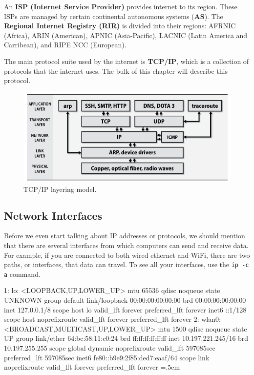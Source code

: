 \documentclass{article}
\newenvironment{cverbatim}
    {\SaveVerbatim{cverb}}
    {\endSaveVerbatim
    \flushleft\fboxrule=0pt\fboxsep=.5em
    \colorbox{cverbbg}{%
      \makebox[\dimexpr\linewidth-2\fboxsep][l]{\BUseVerbatim{cverb}}%
    }
    \endflushleft
  }
\begin{document}
    An \textbf{ISP (Internet Service Provider)} provides internet to its region. These ISPs are managed by certain continental autonomous systems (\textbf{AS}). The \textbf{Regional Internet Registry (RIR)} is divided into their regions: AFRNIC (Africa), ARIN (American), APNIC (Asia-Pacific), LACNIC (Latin America and Carribean), and RIPE NCC (European). 

    The main protocol suite used by the internet is \textbf{TCP/IP}, which is a collection of protocols that the internet uses. The bulk of this chapter will describe this protocol. 

    \begin{figure}[hbt!]
      \centering
      \includegraphics[scale=0.7]{img/tcp_ip_model.png}
      \caption{TCP/IP layering model. }
      \label{fig:tcp_ip_model}
    \end{figure}

  \subsection{Network Interfaces}

    Before we even start talking about IP addresses or protocols, we should mention that there are several interfaces from which computers can send and receive data. For example, if you are connected to both wired ethernet and WiFi, there are two paths, or interfaces, that data can travel. To see all your interfaces, use the \texttt{ip -c a} command. 

    \begin{cverbatim} 
      1: lo: <LOOPBACK,UP,LOWER_UP> mtu 65536 qdisc noqueue state UNKNOWN group default  
          link/loopback 00:00:00:00:00:00 brd 00:00:00:00:00:00
          inet 127.0.0.1/8 scope host lo
             valid_lft forever preferred_lft forever
          inet6 ::1/128 scope host noprefixroute 
             valid_lft forever preferred_lft forever
      2: wlan0: <BROADCAST,MULTICAST,UP,LOWER_UP> mtu 1500 qdisc noqueue state UP group 
          link/ether 64:bc:58:11:c0:24 brd ff:ff:ff:ff:ff:ff
          inet 10.197.221.245/16 brd 10.197.255.255 scope global dynamic noprefixroute 
             valid_lft 597085sec preferred_lft 597085sec
          inet6 fe80::b9e9:2f85:ded7:eaaf/64 scope link noprefixroute 
             valid_lft forever preferred_lft forever
    \end{cverbatim}
\end{document}
